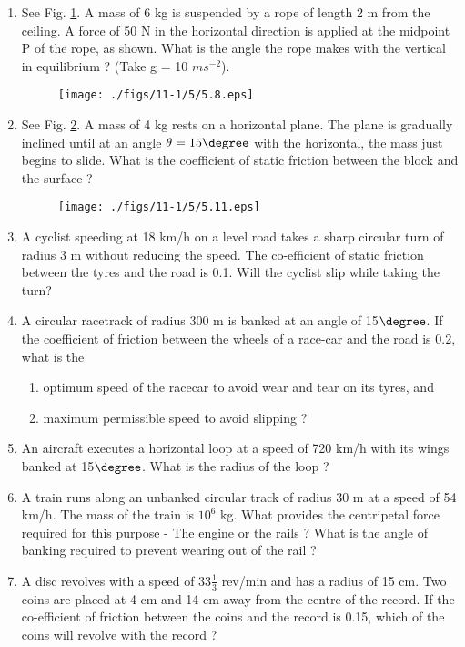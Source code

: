 \begin{enumerate}[label=\arabic*.,ref=\thesubsection.\theenumi]
\item See Fig. \ref{fig:5.8}. A mass of 6 kg is suspended by a rope of length 2 m from the ceiling. A force of 50 N in the horizontal direction is applied at the midpoint P of the rope, as shown. What is the angle the rope makes with the vertical in equilibrium ? (Take g = 10 $m s^{-2}$).
\begin{figure}[!ht]
\centering
\texttt{[image: ./figs/11-1/5/5.8.eps]}
\caption{}
\label{fig:5.8}
\end{figure} 
\item See Fig. \ref{fig:5.11}. A mass of 4 kg rests on a horizontal plane. The plane is gradually inclined until at an angle $\theta = 15\degree$ with the horizontal, the mass just begins to slide. What is the coefficient of static friction between the block and the surface ?
\begin{figure}[!ht]
\centering
\texttt{[image: ./figs/11-1/5/5.11.eps]}
\caption{}
\label{fig:5.11}
\end{figure} 
\item A cyclist speeding at 18 km/h on a level road takes a sharp circular turn of radius 3 m without reducing the speed. The co-efficient of static friction between the tyres and the road is 0.1. Will the cyclist slip while taking the turn?
\item A circular racetrack of radius 300 m is banked at an angle of 15$\degree$. If the coefficient of friction between the wheels of a race-car and the road is 0.2, what is the 
\begin{enumerate}
\item  optimum speed of the racecar to avoid wear and tear on its tyres, and 
\item  maximum permissible speed to avoid slipping ?
\end{enumerate}
\item An aircraft executes a horizontal loop at a speed of 720 km/h with its wings banked at 15$\degree$. What is the radius of the loop ?
\item A train runs along an unbanked circular track of radius 30 m at a speed of 54 km/h. The mass of the train is $10^6$
kg. What provides the centripetal force required for this
purpose - The engine or the rails ? What is the angle of banking required to prevent wearing out of the rail ?
\item A disc revolves with a speed of $33 \frac{1}{ 3}$ rev/min 
 and has a radius of 15 cm. Two coins are
placed at 4 cm and 14 cm away from the centre of the record. If the co-efficient of friction between the coins and the record is 0.15, which of the coins will revolve with the record ?

\end{enumerate}
